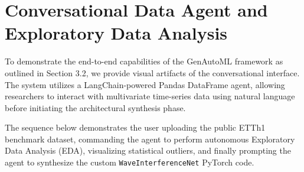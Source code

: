 \documentclass{article}
\begin{document}
\clearpage

\section{Conversational Data Agent and Exploratory Data Analysis}
\label{app:chatbot_ui}

To demonstrate the end-to-end capabilities of the GenAutoML framework as outlined in Section 3.2, we provide visual artifacts of the conversational interface. The system utilizes a LangChain-powered Pandas DataFrame agent, allowing researchers to interact with multivariate time-series data using natural language before initiating the architectural synthesis phase.

The sequence below demonstrates the user uploading the public ETTh1 benchmark dataset, commanding the agent to perform autonomous Exploratory Data Analysis (EDA), visualizing statistical outliers, and finally prompting the agent to synthesize the custom \texttt{WaveInterferenceNet} PyTorch code.
\end{document}

